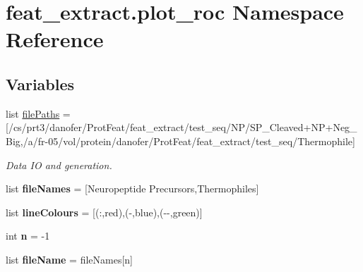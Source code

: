 \hypertarget{namespacefeat__extract_1_1plot__roc}{}\section{feat\+\_\+extract.\+plot\+\_\+roc Namespace Reference}
\label{namespacefeat__extract_1_1plot__roc}
\subsection*{Variables}
\begin{DoxyCompactItemize}
\item 
list \hyperlink{namespacefeat__extract_1_1plot__roc_a1e739bbf71d2ec8c6fd3045e50b87ab7}{file\+Paths} = \mbox{[}\textquotesingle{}/cs/prt3/danofer/Prot\+Feat/feat\+\_\+extract/test\+\_\+seq/N\+P/S\+P\+\_\+\+Cleaved+N\+P+Neg\+\_\+\+Big\textquotesingle{},\textquotesingle{}/a/fr-\/05/vol/protein/danofer/Prot\+Feat/feat\+\_\+extract/test\+\_\+seq/Thermophile\textquotesingle{}\mbox{]}
\begin{DoxyCompactList}\small\item\em Data I\+O and generation. \end{DoxyCompactList}\item 
\hypertarget{namespacefeat__extract_1_1plot__roc_a342df99fbf248b64c6b6560a0606c329}{}list {\bfseries file\+Names} = \mbox{[}\textquotesingle{}Neuropeptide Precursors\textquotesingle{},\textquotesingle{}Thermophiles\textquotesingle{}\mbox{]}\label{namespacefeat__extract_1_1plot__roc_a342df99fbf248b64c6b6560a0606c329}

\item 
\hypertarget{namespacefeat__extract_1_1plot__roc_a4c01be685a085feceb4b6b5d8ca7b35c}{}list {\bfseries line\+Colours} = \mbox{[}(\textquotesingle{}\+:\textquotesingle{},\textquotesingle{}red\textquotesingle{}),(\textquotesingle{}-\/\textquotesingle{},\textquotesingle{}blue\textquotesingle{}),(\textquotesingle{}-\/-\/\textquotesingle{},\textquotesingle{}green\textquotesingle{})\mbox{]}\label{namespacefeat__extract_1_1plot__roc_a4c01be685a085feceb4b6b5d8ca7b35c}

\item 
\hypertarget{namespacefeat__extract_1_1plot__roc_a7d9aea0af8a3573ac055df57dfebb55c}{}int {\bfseries n} = -\/1\label{namespacefeat__extract_1_1plot__roc_a7d9aea0af8a3573ac055df57dfebb55c}

\item 
\hypertarget{namespacefeat__extract_1_1plot__roc_aca74af019250da2bfe1baae87d16fbc6}{}list {\bfseries file\+Name} = file\+Names\mbox{[}n\mbox{]}\label{namespacefeat__extract_1_1plot__roc_aca74af019250da2bfe1baae87d16fbc6}


\end{DoxyCompactItemize}
